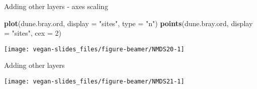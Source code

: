 \documentclass[10pt,ignorenonframetext,compress, aspectratio=169]{beamer}
\newenvironment{Shaded}{\begin{snugshade}}{\end{snugshade}}
\newcommand{\KeywordTok}[1]{\textcolor[rgb]{0.13,0.29,0.53}{\textbf{{#1}}}}
\newcommand{\DataTypeTok}[1]{\textcolor[rgb]{0.13,0.29,0.53}{{#1}}}
\newcommand{\DecValTok}[1]{\textcolor[rgb]{0.00,0.00,0.81}{{#1}}}
\newcommand{\StringTok}[1]{\textcolor[rgb]{0.31,0.60,0.02}{{#1}}}
\newcommand{\OtherTok}[1]{\textcolor[rgb]{0.56,0.35,0.01}{{#1}}}
\newcommand{\NormalTok}[1]{{#1}}
\begin{document}
\begin{frame}[fragile]{Adding other layers - axes scaling}

\scriptsize

\begin{Shaded}
\begin{Highlighting}[]
\KeywordTok{plot}\NormalTok{(dune.bray.ord, }\DataTypeTok{display =} \StringTok{"sites"}\NormalTok{, }\DataTypeTok{type =} \StringTok{"n"}\NormalTok{)}
\KeywordTok{points}\NormalTok{(dune.bray.ord, }\DataTypeTok{display =} \StringTok{"sites"}\NormalTok{, }\DataTypeTok{cex =} \DecValTok{2}\NormalTok{)}
\end{Highlighting}
\end{Shaded}

\begin{center}\texttt{[image: vegan-slides\_files/figure-beamer/NMDS20-1]} \end{center}

\normalsize

\end{frame}

\begin{frame}[fragile]{Adding other layers}

\scriptsize

\begin{Shaded}
\end{Shaded}

\begin{center}\texttt{[image: vegan-slides\_files/figure-beamer/NMDS21-1]} \end{center}

\normalsize

\end{frame}
\end{document}
